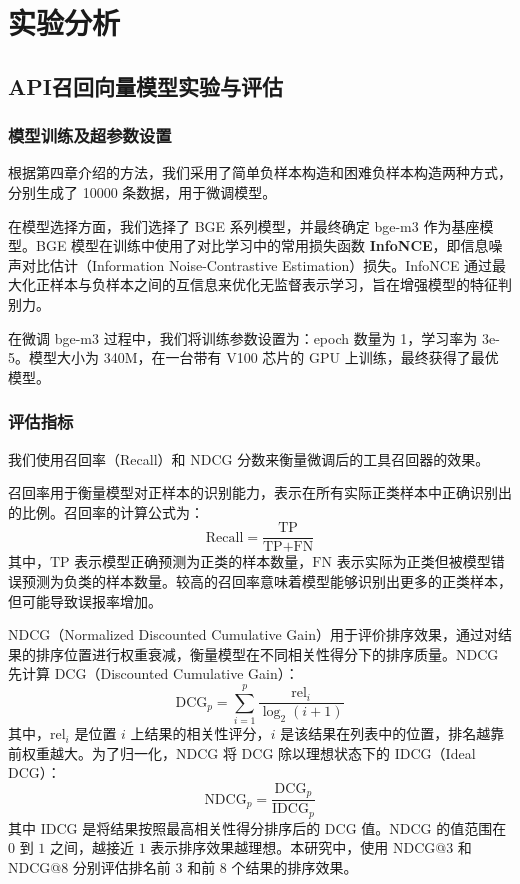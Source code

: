 \chapter{实验分析}

\section{API召回向量模型实验与评估}

\subsection{模型训练及超参数设置}

根据第四章介绍的方法，我们采用了简单负样本构造和困难负样本构造两种方式，分别生成了 10000 条数据，用于微调模型。

在模型选择方面，我们选择了 BGE 系列模型，并最终确定 bge-m3 作为基座模型。BGE 模型在训练中使用了对比学习中的常用损失函数 \textbf{InfoNCE}，即信息噪声对比估计（Information Noise-Contrastive Estimation）损失。InfoNCE 通过最大化正样本与负样本之间的互信息来优化无监督表示学习，旨在增强模型的特征判别力。

在微调 bge-m3 过程中，我们将训练参数设置为：epoch 数量为 1，学习率为 3e-5。模型大小为 340M，在一台带有 V100 芯片的 GPU 上训练，最终获得了最优模型。

\subsection{评估指标}

我们使用召回率（Recall）\cite{buckland1994relationship, powers2020evaluation}和 NDCG 分数\cite{wang2013theoretical}来衡量微调后的工具召回器的效果。

召回率用于衡量模型对正样本的识别能力，表示在所有实际正类样本中正确识别出的比例。召回率的计算公式为：
\begin{equation}
\text{Recall} = \frac{\text{TP}}{\text{TP} + \text{FN}}
\end{equation}
其中，$\text{TP}$ 表示模型正确预测为正类的样本数量，$\text{FN}$ 表示实际为正类但被模型错误预测为负类的样本数量。较高的召回率意味着模型能够识别出更多的正类样本，但可能导致误报率增加。

NDCG（Normalized Discounted Cumulative Gain）用于评价排序效果，通过对结果的排序位置进行权重衰减，衡量模型在不同相关性得分下的排序质量。NDCG 先计算 DCG（Discounted Cumulative Gain）：
\begin{equation}
\text{DCG}_p = \sum_{i=1}^{p} \frac{\text{rel}_i}{\log_2(i+1)}
\end{equation}
其中，$\text{rel}_i$ 是位置 $i$ 上结果的相关性评分，$i$ 是该结果在列表中的位置，排名越靠前权重越大。为了归一化，NDCG 将 DCG 除以理想状态下的 IDCG（Ideal DCG）：
\begin{equation}
\text{NDCG}_p = \frac{\text{DCG}_p}{\text{IDCG}_p}
\end{equation}
其中 IDCG 是将结果按照最高相关性得分排序后的 DCG 值。NDCG 的值范围在 $0$ 到 $1$ 之间，越接近 $1$ 表示排序效果越理想。本研究中，使用 NDCG@3 和 NDCG@8 分别评估排名前 3 和前 8 个结果的排序效果。


